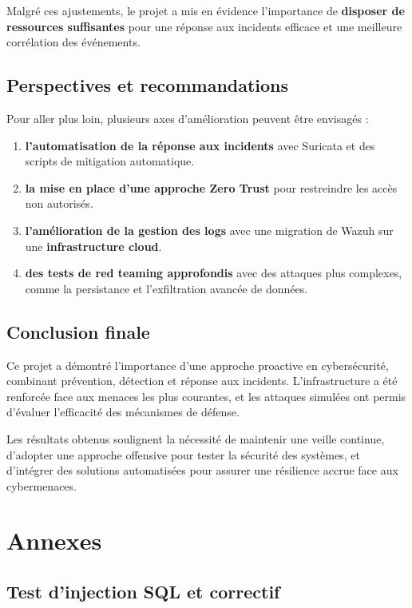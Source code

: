 \documentclass[a4paper,12pt]{report}
\begin{document}
Malgré ces ajustements, le projet a mis en évidence l’importance de \textbf{disposer de ressources suffisantes} pour une réponse aux incidents efficace et une meilleure corrélation des événements.

\section{Perspectives et recommandations}

Pour aller plus loin, plusieurs axes d’amélioration peuvent être envisagés :

\begin{enumerate}
    \item \textbf{l'automatisation de la réponse aux incidents} avec Suricata et des scripts de mitigation automatique.
    \item \textbf{la mise en place d’une approche Zero Trust} pour restreindre les accès non autorisés.
    \item \textbf{l'amélioration de la gestion des logs} avec une migration de Wazuh sur une \textbf{infrastructure cloud}.
    \item \textbf{des tests de red teaming approfondis} avec des attaques plus complexes, comme la persistance et l’exfiltration avancée de données.
\end{enumerate}

\section{Conclusion finale}

Ce projet a démontré l’importance d’une approche proactive en cybersécurité, combinant prévention, détection et réponse aux incidents. L’infrastructure a été renforcée face aux menaces les plus courantes, et les attaques simulées ont permis d’évaluer l’efficacité des mécanismes de défense.

Les résultats obtenus soulignent la nécessité de maintenir une veille continue, d’adopter une approche offensive pour tester la sécurité des systèmes, et d’intégrer des solutions automatisées pour assurer une résilience accrue face aux cybermenaces.





\chapter{Annexes}

\section{Test d'injection SQL et correctif}
\end{document}
